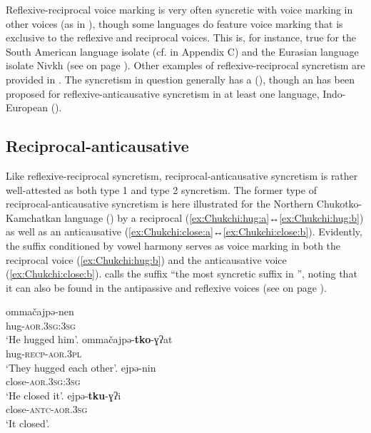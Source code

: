 Reflexive-reciprocal voice marking is very often syncretic with voice marking in other voices (as in ), though some languages do feature voice marking that is exclusive to the reflexive and reciprocal voices. This is, for instance, true for the South American language isolate  (cf.  in Appendix C) and the Eurasian language isolate Nivkh (see  on page \pageref{tab:ch7:refl-antc-world}). Other examples of reflexive-reciprocal syncretism are provided in . The syncretism in question generally has a  (), though an  has been proposed for reflexive-anticausative syncretism in at least one language, Indo-European  ().

\subsection{Reciprocal-anticausative} \label{sec:simple-syncretism:recp-antc}
Like reflexive-reciprocal syncretism, reciprocal-anticausative syncretism is rather well-attested as both type 1 and type 2 syncretism. The former type of reciprocal-anticausative syncretism is here illustrated for the Northern Chu\-kot\-ko-Kam\-chat\-kan language  () by a reciprocal  (\ref{ex:Chukchi:hug:a}↔\ref{ex:Chukchi:hug:b}) as well as an anticausative  (\ref{ex:Chukchi:close:a}↔\ref{ex:Chukchi:close:b}). Evidently, the suffix  conditioned by vowel harmony \citep[48]{dunn:1999} serves as voice marking in both the reciprocal voice (\ref{ex:Chukchi:hug:b}) and the anticausative voice (\ref{ex:Chukchi:close:b}). \cite[221f.]{nedjalkov:2006} calls the suffix “the most syncretic suffix in ”, noting that it can also be found in the antipassive and reflexive voices (see  on page \pageref{tab:ch5:antp-refl-recp-antc}).

\ea {} \citep[222]{nedjalkov:2006}
\ea\label{ex:Chukchi:hug:a}
	\gll	ommačajpə-nen \\
			hug-\textsc{aor.3sg:3sg} \\
	\glt	‘He hugged him’.
\ex\label{ex:Chukchi:hug:b}
	\gll	ommačajpə-\textbf{tko}-ɣʔat \\
			hug-\textsc{recp-aor.3pl} \\
	\glt	‘They hugged each other’.
\ex\label{ex:Chukchi:close:a}
	\gll	ejpə-nin \\
			close-\textsc{aor.3sg:3sg} \\
	\glt	‘He closed it’.
\ex\label{ex:Chukchi:close:b}
	\gll	ejpə-\textbf{tku}-ɣʔi \\
			close-\textsc{antc-aor.3sg} \\
	\glt	‘It closed’.
	\z 
\z


